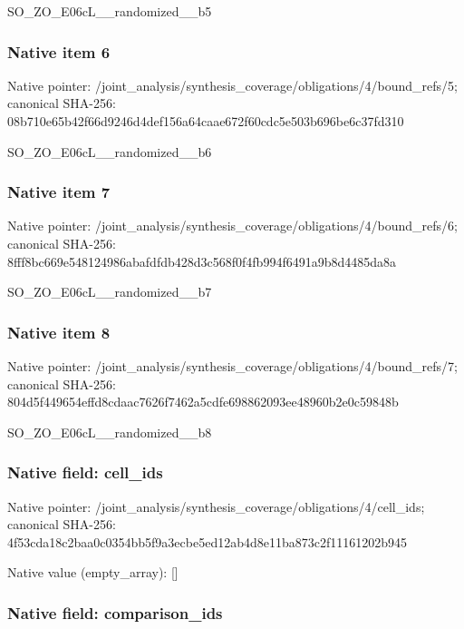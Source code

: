 \documentclass[10pt,a4paper]{article}
\begin{document}
SO\_ZO\_E06cL\_\_randomized\_\_b5


\subsubsection{Native item 6}


Native pointer: /joint\_analysis/synthesi\allowbreak{}s\_coverage/obligations/4\allowbreak{}/bound\_refs/5; canonical SHA-256: 08b710e65b42f66d9246d4de\allowbreak{}f156a64caae672f60cdc5e50\allowbreak{}3b696be6c37fd310


SO\_ZO\_E06cL\_\_randomized\_\_b6


\subsubsection{Native item 7}


Native pointer: /joint\_analysis/synthesi\allowbreak{}s\_coverage/obligations/4\allowbreak{}/bound\_refs/6; canonical SHA-256: 8fff8bc669e548124986abaf\allowbreak{}dfdb428d3c568f0f4fb994f6\allowbreak{}491a9b8d4485da8a


SO\_ZO\_E06cL\_\_randomized\_\_b7


\subsubsection{Native item 8}


Native pointer: /joint\_analysis/synthesi\allowbreak{}s\_coverage/obligations/4\allowbreak{}/bound\_refs/7; canonical SHA-256: 804d5f449654effd8cdaac76\allowbreak{}26f7462a5cdfe698862093ee\allowbreak{}48960b2e0c59848b


SO\_ZO\_E06cL\_\_randomized\_\_b8


\subsubsection{Native field: cell\_ids}


Native pointer: /joint\_analysis/synthesi\allowbreak{}s\_coverage/obligations/4\allowbreak{}/cell\_ids; canonical SHA-256: 4f53cda18c2baa0c0354bb5f\allowbreak{}9a3ecbe5ed12ab4d8e11ba87\allowbreak{}3c2f11161202b945



Native value (empty\_array): []



\subsubsection{Native field: comparison\_ids}
\end{document}
